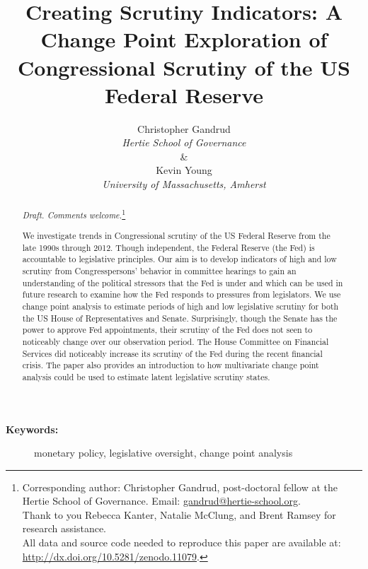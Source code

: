 \documentclass[a4paper]{article}\usepackage[]{graphicx}\usepackage[]{color}
\title{Creating Scrutiny Indicators: A Change Point Exploration of Congressional Scrutiny of the US Federal Reserve}
\author{Christopher Gandrud \\ {\emph{Hertie School of Governance}} \\ \& \\ Kevin Young \\ {\emph{University of Massachusetts, Amherst}}}
\begin{document}
\maketitle

\begin{abstract}

\noindent\emph{Draft. Comments welcome.}\footnote{Corresponding author: Christopher Gandrud, post-doctoral fellow at the Hertie School of Governance. Email: \href{mailto:gandrud@hertie-school.org}{gandrud@hertie-school.org}. \\ Thank to you Rebecca Kanter, Natalie McClung, and Brent Ramsey for research assistance. \\
All data and source code needed to reproduce this paper are available at: \url{http://dx.doi.org/10.5281/zenodo.11079}.}

We investigate trends in Congressional scrutiny of the US Federal Reserve from the late 1990s through 2012. Though independent, the Federal Reserve (the Fed) is accountable to legislative principles. Our aim is to develop indicators of high and low scrutiny from Congresspersons' behavior in committee hearings to gain an understanding of the political stressors that the Fed is under and which can be used in future research to examine how the Fed responds to pressures from legislators. We use change point analysis to estimate periods of high and low legislative scrutiny for both the US House of Representatives and Senate. Surprisingly, though the Senate has the power to approve Fed appointments, their scrutiny of the Fed does not seen to noticeably change over our observation period. The House Committee on Financial Services did noticeably increase its scrutiny of the Fed during the recent financial crisis. The paper also provides an introduction to how multivariate change point analysis could be used to estimate latent legislative scrutiny states.

\end{abstract}

\begin{description}
  \item [{\textbf{Keywords:}}] monetary policy, legislative oversight, change point analysis
\end{description}
\end{document}
